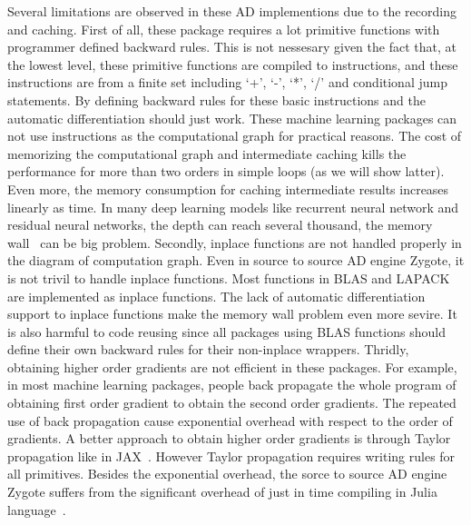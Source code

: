 \documentclass[aps,twocolumn,longbibliography,english,superscriptaddress,prr]{revtex4-1}
\newcommand{\<}{\langle}
\renewcommand{\>}{\rangle}
\theoremstyle{definition}\newtheorem{definition}{\textit{Definition}}
\begin{document}
    Several limitations are observed in these AD implementions due to the recording and caching. First of all, these package requires a lot primitive functions with programmer defined backward rules. This is not nessesary given the fact that, at the lowest level, these primitive functions are compiled to instructions, and these instructions are from a finite set including `+', `-', `*', `/' and conditional jump statements. By defining backward rules for these basic instructions and the automatic differentiation should just work. These machine learning packages can not use instructions as the computational graph for practical reasons. The cost of memorizing the computational graph and intermediate caching kills the performance for more than two orders in simple loops (as we will show latter).
Even more, the memory consumption for caching intermediate results increases linearly as time. In many deep learning models like recurrent neural network and residual neural networks, the depth can reach several thousand, the memory wall~\cite{memorywall} can be big problem.
    Secondly, inplace functions are not handled properly in the diagram of computation graph. Even in source to source AD engine Zygote, it is not trivil to handle inplace functions. Most functions in BLAS and LAPACK are implemented as inplace functions. The lack of automatic differentiation support to inplace functions make the memory wall problem even more sevire. It is also harmful to code reusing since all packages using BLAS functions should define their own backward rules for their non-inplace wrappers.
    Thridly, obtaining higher order gradients are not efficient in these packages. For example, in most machine learning packages, people back propagate the whole program of obtaining first order gradient to obtain the second order gradients. The repeated use of back propagation cause exponential overhead with respect to the order of gradients. A better approach to obtain higher order gradients is through Taylor propagation like in JAX~\cite{Bettencourt2019}. However Taylor propagation requires writing rules for all primitives. Besides the exponential overhead, the sorce to source AD engine Zygote suffers from the significant overhead of just in time compiling in Julia language~\cite{Bezanson2017}.

\end{document}
